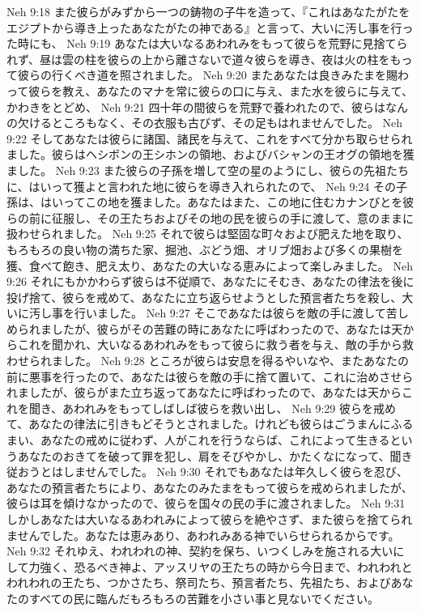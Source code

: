 Neh 9:18  また彼らがみずから一つの鋳物の子牛を造って、『これはあなたがたをエジプトから導き上ったあなたがたの神である』と言って、大いに汚し事を行った時にも、
Neh 9:19  あなたは大いなるあわれみをもって彼らを荒野に見捨てられず、昼は雲の柱を彼らの上から離さないで道々彼らを導き、夜は火の柱をもって彼らの行くべき道を照されました。
Neh 9:20  またあなたは良きみたまを賜わって彼らを教え、あなたのマナを常に彼らの口に与え、また水を彼らに与えて、かわきをとどめ、
Neh 9:21  四十年の間彼らを荒野で養われたので、彼らはなんの欠けるところもなく、その衣服も古びず、その足もはれませんでした。
Neh 9:22  そしてあなたは彼らに諸国、諸民を与えて、これをすべて分かち取らせられました。彼らはヘシボンの王シホンの領地、およびバシャンの王オグの領地を獲ました。
Neh 9:23  また彼らの子孫を増して空の星のようにし、彼らの先祖たちに、はいって獲よと言われた地に彼らを導き入れられたので、
Neh 9:24  その子孫は、はいってこの地を獲ました。あなたはまた、この地に住むカナンびとを彼らの前に征服し、その王たちおよびその地の民を彼らの手に渡して、意のままに扱わせられました。
Neh 9:25  それで彼らは堅固な町々および肥えた地を取り、もろもろの良い物の満ちた家、掘池、ぶどう畑、オリブ畑および多くの果樹を獲、食べて飽き、肥え太り、あなたの大いなる恵みによって楽しみました。
Neh 9:26  それにもかかわらず彼らは不従順で、あなたにそむき、あなたの律法を後に投げ捨て、彼らを戒めて、あなたに立ち返らせようとした預言者たちを殺し、大いに汚し事を行いました。
Neh 9:27  そこであなたは彼らを敵の手に渡して苦しめられましたが、彼らがその苦難の時にあなたに呼ばわったので、あなたは天からこれを聞かれ、大いなるあわれみをもって彼らに救う者を与え、敵の手から救わせられました。
Neh 9:28  ところが彼らは安息を得るやいなや、またあなたの前に悪事を行ったので、あなたは彼らを敵の手に捨て置いて、これに治めさせられましたが、彼らがまた立ち返ってあなたに呼ばわったので、あなたは天からこれを聞き、あわれみをもってしばしば彼らを救い出し、
Neh 9:29  彼らを戒めて、あなたの律法に引きもどそうとされました。けれども彼らはごうまんにふるまい、あなたの戒めに従わず、人がこれを行うならば、これによって生きるというあなたのおきてを破って罪を犯し、肩をそびやかし、かたくなになって、聞き従おうとはしませんでした。
Neh 9:30  それでもあなたは年久しく彼らを忍び、あなたの預言者たちにより、あなたのみたまをもって彼らを戒められましたが、彼らは耳を傾けなかったので、彼らを国々の民の手に渡されました。
Neh 9:31  しかしあなたは大いなるあわれみによって彼らを絶やさず、また彼らを捨てられませんでした。あなたは恵みあり、あわれみある神でいらせられるからです。
Neh 9:32  それゆえ、われわれの神、契約を保ち、いつくしみを施される大いにして力強く、恐るべき神よ、アッスリヤの王たちの時から今日まで、われわれとわれわれの王たち、つかさたち、祭司たち、預言者たち、先祖たち、およびあなたのすべての民に臨んだもろもろの苦難を小さい事と見ないでください。
